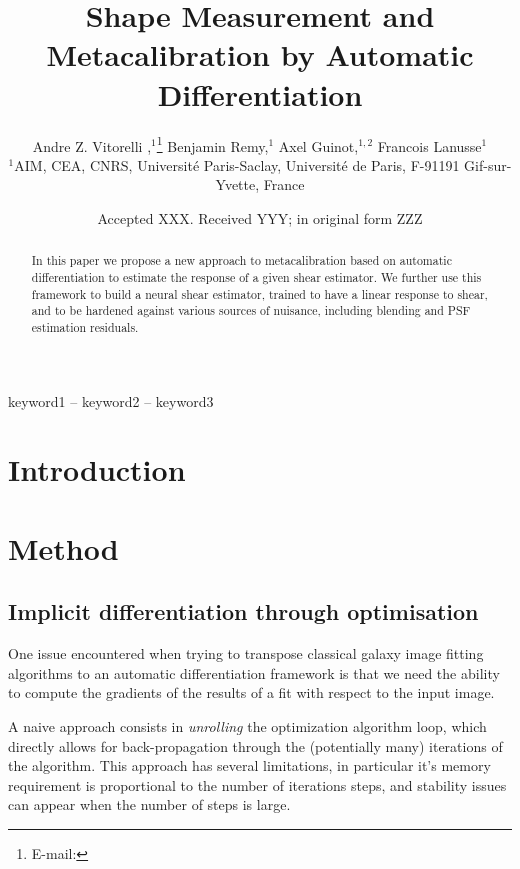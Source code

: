 \documentclass[fleqn,usenatbib]{mnras}
\title[AutoMetaCal]{Shape Measurement and Metacalibration by Automatic Differentiation}
\author[Vitorelli et al.]{
Andre Z. Vitorelli ,$^{1}$\thanks{E-mail: }
Benjamin Remy,$^{1}$
Axel Guinot,$^{1,2}$
Francois Lanusse$^{1}$
\\
$^{1}$AIM, CEA, CNRS, Université Paris-Saclay, Université de Paris, F-91191 Gif-sur-Yvette, France
}
\date{Accepted XXX. Received YYY; in original form ZZZ}
\begin{document}
\label{firstpage}
\pagerange{\pageref{firstpage}--\pageref{lastpage}}
\maketitle

\begin{abstract}
In this paper we propose a new approach to metacalibration based on automatic differentiation
to estimate the response of a given shear estimator. We further use this framework to
build a neural shear estimator, trained to have a linear response to shear, and to be 
hardened against various sources of nuisance, including blending and PSF estimation residuals.
\end{abstract}

\begin{keywords}
keyword1 -- keyword2 -- keyword3
\end{keywords}



\section{Introduction}

\section{Method}

\subsection{Implicit differentiation through optimisation}

One issue encountered when trying to transpose classical galaxy image fitting algorithms to an automatic differentiation framework is that we need the ability to compute the gradients of the results of a fit with respect to the input image. 

A naive approach consists in \textit{unrolling} the optimization algorithm loop, which directly allows for back-propagation through the (potentially many) iterations of the algorithm. This approach has several limitations, in particular it's memory requirement is proportional to the number of iterations steps, and stability issues can appear when the number of steps is large.
\end{document}

